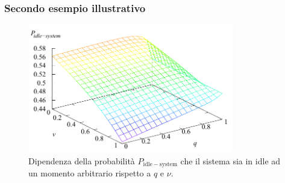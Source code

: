 \documentclass{beamer}
\begin{document}


\begin{frame}
    \frametitle{Secondo esempio illustrativo}
    \begin{figure}[h!]
        \centering
        \includegraphics[width=0.8\textwidth]{3zlg6uj.png}
        \caption{Dipendenza della probabilità $P_\mathrm{idle-system}$ che il sistema sia in idle ad un momento arbitrario rispetto a $q$ e $\nu$.}
    \end{figure}
\end{frame}


\end{document}

